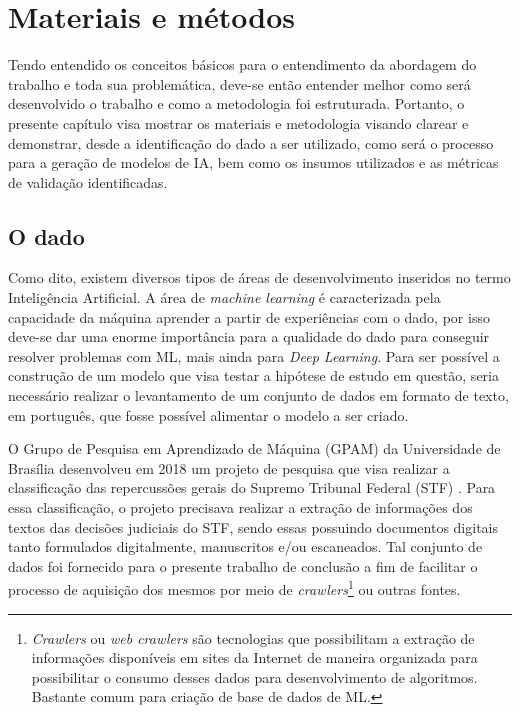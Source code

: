 \chapter[Materiais e métodos]{Materiais e métodos} \label{chap:materials-and-methods}

Tendo entendido os conceitos básicos para o entendimento da abordagem do trabalho e toda sua problemática, deve-se então entender melhor como será desenvolvido o trabalho e como a metodologia foi estruturada. Portanto, o presente capítulo visa mostrar os materiais e metodologia visando clarear e demonstrar, desde a identificação do dado a ser utilizado, como será o processo para a geração de modelos de IA, bem como os insumos utilizados e as métricas de validação identificadas.

\section{O dado} \label{sec:dataset}

Como dito, existem diversos tipos de áreas de desenvolvimento inseridos no termo Inteligência Artificial. A área de \textit{machine learning} é caracterizada pela capacidade da máquina aprender a partir de experiências com o dado, por isso deve-se dar uma enorme importância para a qualidade do dado para conseguir resolver problemas com ML, mais ainda para \textit{Deep Learning}. Para ser possível a construção de um modelo que visa testar a hipótese de estudo em questão, seria necessário realizar o levantamento de um conjunto de dados em formato de texto, em português, que fosse possível alimentar o modelo a ser criado.

O Grupo de Pesquisa em Aprendizado de Máquina (GPAM) da Universidade de Brasília desenvolveu em 2018 um projeto de pesquisa que visa realizar a classificação das repercussões gerais do Supremo Tribunal Federal (STF) \cite{cnn-for-STF}. Para essa classificação, o projeto precisava realizar a extração de informações dos textos das decisões judiciais do STF, sendo essas possuindo documentos digitais tanto formulados digitalmente, manuscritos e/ou escaneados. Tal conjunto de dados foi fornecido para o presente trabalho de conclusão a fim de facilitar o processo de aquisição dos mesmos por meio de \textit{crawlers}\footnote{
  \textit{Crawlers} ou \textit{web crawlers} são tecnologias que possibilitam a extração de informações disponíveis em sites da Internet de maneira organizada para possibilitar o consumo desses dados para desenvolvimento de algoritmos. Bastante comum para criação de base de dados de ML.
} ou outras fontes.

